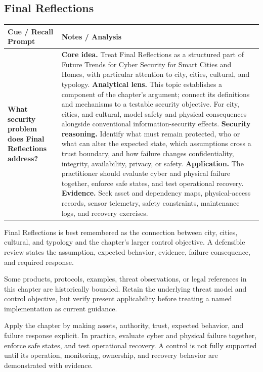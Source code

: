 \documentclass[11pt]{article}
\newcommand{\CornellHeader}{%
\rowcolor{Navy}\color{white}\bfseries Cue / Recall Prompt & \color{white}\bfseries Notes / Analysis\\\hline}
\newcommand{\CornellRow}[2]{%
\cellcolor{CueGray}\RaggedRight\textbf{#1} & \RaggedRight #2\\\hline}
\begin{document}
\subsection*{Final Reflections}
\begin{longtable}{>{\RaggedRight\arraybackslash}p{}|>{\RaggedRight\arraybackslash}p{}}
\CornellHeader
\CornellRow{What security problem does Final Reflections address?}{\textbf{Core idea.} Treat Final Reflections as a structured part of Future Trends for Cyber Security for Smart Cities and Homes, with particular attention to city, cities, cultural, and typology. \textbf{Analytical lens.} This topic establishes a component of the chapter's argument; connect its definitions and mechanisms to a testable security objective. For city, cities, and cultural, model safety and physical consequences alongside conventional information-security effects. \textbf{Security reasoning.} Identify what must remain protected, who or what can alter the expected state, which assumptions cross a trust boundary, and how failure changes confidentiality, integrity, availability, privacy, or safety. \textbf{Application.} The practitioner should evaluate cyber and physical failure together, enforce safe states, and test operational recovery. \textbf{Evidence.} Seek asset and dependency maps, physical-access records, sensor telemetry, safety constraints, maintenance logs, and recovery exercises.}
\end{longtable}
\begin{topicsummary}
Final Reflections is best remembered as the connection between city, cities, cultural, and typology and the chapter's larger control objective. A defensible review states the assumption, expected behavior, evidence, failure consequence, and required response.
\end{topicsummary}
\begin{historybox}
Some products, protocols, examples, threat observations, or legal references in this chapter are historically bounded. Retain the underlying threat model and control objective, but verify present applicability before treating a named implementation as current guidance.
\end{historybox}
\begin{defensebox}
Apply the chapter by making assets, authority, trust, expected behavior, and failure response explicit. In practice, evaluate cyber and physical failure together, enforce safe states, and test operational recovery. A control is not fully supported until its operation, monitoring, ownership, and recovery behavior are demonstrated with evidence.
\end{defensebox}
\end{document}
